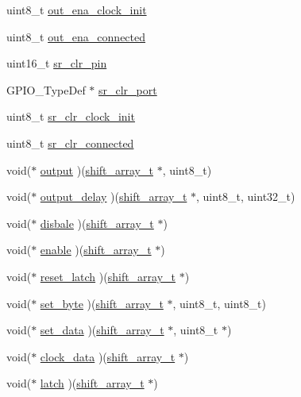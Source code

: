 \begin{DoxyCompactItemize}
\item 
uint8\+\_\+t \hyperlink{structshift__array_ab7db4e525df402f9806812e04f5598d7}{out\+\_\+ena\+\_\+clock\+\_\+init}
\item 
uint8\+\_\+t \hyperlink{structshift__array_a1ddeca74eea96c5b6519351b4e00f6eb}{out\+\_\+ena\+\_\+connected}
\item 
uint16\+\_\+t \hyperlink{structshift__array_a21f42e62dd6e25baaf1286ec354bbac6}{sr\+\_\+clr\+\_\+pin}
\item 
G\+P\+I\+O\+\_\+\+Type\+Def $\ast$ \hyperlink{structshift__array_a55765413a894d12c127fbfd9f6d789b8}{sr\+\_\+clr\+\_\+port}
\item 
uint8\+\_\+t \hyperlink{structshift__array_a906114429befc76d97f5373724f223e8}{sr\+\_\+clr\+\_\+clock\+\_\+init}
\item 
uint8\+\_\+t \hyperlink{structshift__array_a2e0fca29bc32e2c98785e5b5dd29fba3}{sr\+\_\+clr\+\_\+connected}
\item 
void($\ast$ \hyperlink{structshift__array_a347c8223ca4f26506504795959daf5a1}{output} )(\hyperlink{datatypes_8h_adb530ee69b7a28ad91cf00a7c665a2f5}{shift\+\_\+array\+\_\+t} $\ast$, uint8\+\_\+t)
\item 
void($\ast$ \hyperlink{structshift__array_ad7c2928679d39648411f9c93d39bc71d}{output\+\_\+delay} )(\hyperlink{datatypes_8h_adb530ee69b7a28ad91cf00a7c665a2f5}{shift\+\_\+array\+\_\+t} $\ast$, uint8\+\_\+t, uint32\+\_\+t)
\item 
void($\ast$ \hyperlink{structshift__array_a5abcf96f024b7ba533f93d250bad4ce9}{disbale} )(\hyperlink{datatypes_8h_adb530ee69b7a28ad91cf00a7c665a2f5}{shift\+\_\+array\+\_\+t} $\ast$)
\item 
void($\ast$ \hyperlink{structshift__array_a37c7518b1c537f5abd8bedfdd8a328e0}{enable} )(\hyperlink{datatypes_8h_adb530ee69b7a28ad91cf00a7c665a2f5}{shift\+\_\+array\+\_\+t} $\ast$)
\item 
void($\ast$ \hyperlink{structshift__array_a824f16c7b6e009fb2fb46c967e0747c4}{reset\+\_\+latch} )(\hyperlink{datatypes_8h_adb530ee69b7a28ad91cf00a7c665a2f5}{shift\+\_\+array\+\_\+t} $\ast$)
\item 
void($\ast$ \hyperlink{structshift__array_aee5df34cb4bb958851f405943a5b199a}{set\+\_\+byte} )(\hyperlink{datatypes_8h_adb530ee69b7a28ad91cf00a7c665a2f5}{shift\+\_\+array\+\_\+t} $\ast$, uint8\+\_\+t, uint8\+\_\+t)
\item 
void($\ast$ \hyperlink{structshift__array_a76f5623e40afe246c1fade4b2d5318cc}{set\+\_\+data} )(\hyperlink{datatypes_8h_adb530ee69b7a28ad91cf00a7c665a2f5}{shift\+\_\+array\+\_\+t} $\ast$, uint8\+\_\+t $\ast$)
\item 
void($\ast$ \hyperlink{structshift__array_a705e01987c88536fbd23ff1e65842413}{clock\+\_\+data} )(\hyperlink{datatypes_8h_adb530ee69b7a28ad91cf00a7c665a2f5}{shift\+\_\+array\+\_\+t} $\ast$)
\item 
void($\ast$ \hyperlink{structshift__array_a552bb44b6fe9bcbf57757f991a9d86a9}{latch} )(\hyperlink{datatypes_8h_adb530ee69b7a28ad91cf00a7c665a2f5}{shift\+\_\+array\+\_\+t} $\ast$)
\end{DoxyCompactItemize}


